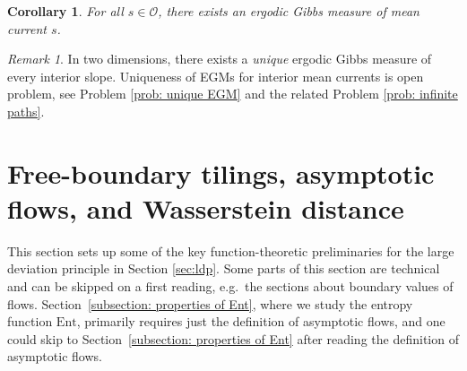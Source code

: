 \documentclass[11pt]{article}
\newtheorem{cor}[thm]{Corollary}
\theoremstyle{remark}
\newtheorem{rem}[thm]{Remark}
\theoremstyle{definition}
\newcommand{\Ent}{\text{Ent}}
\begin{document}
\begin{cor}\label{cor: EGMs exist!}
For all $s\in\mathcal O$, there exists an ergodic Gibbs measure of mean current $s$.
\end{cor}

\begin{rem}
    In two dimensions, there exists a \textit{unique} ergodic Gibbs measure of every interior slope. Uniqueness of EGMs for interior mean currents is open problem, see Problem \ref{prob: unique EGM} and the related Problem \ref{prob: infinite paths}. 
\end{rem}

\section{Free-boundary tilings, asymptotic flows, and Wasserstein distance}\label{sec:asympflows}

This section sets up some of the key function-theoretic preliminaries for the large deviation principle in Section \ref{sec:ldp}. Some parts of this section are technical and can be skipped on a first reading, e.g.\ the sections about boundary values of flows. Section~\ref{subsection: properties of Ent}, where we study the entropy function $\Ent$, primarily requires just the definition of asymptotic flows, and one could skip to Section~\ref{subsection: properties of Ent} after reading the definition of asymptotic flows.
\end{document}
